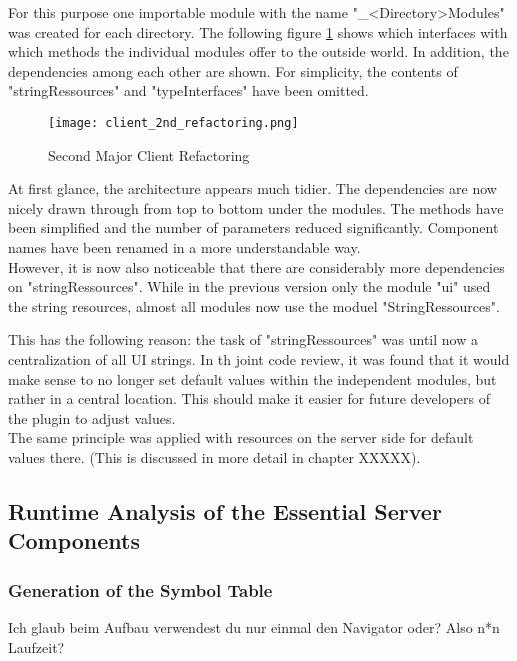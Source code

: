 For this purpose one importable module with the name "\_<Directory>Modules" was created for each directory.
The following figure \ref{fig:client_2nd_refactoring} shows which interfaces with which methods the individual modules offer to the outside world. In addition, the dependencies among each other are shown.
For simplicity, the contents of "stringRessources" and "typeInterfaces" have been omitted. \\

\begin{figure}[H]
    \centering
    \texttt{[image: client\_2nd\_refactoring.png]}
    \caption{Second Major Client Refactoring}
    \label{fig:client_2nd_refactoring}
\end{figure}

At first glance, the architecture appears much tidier.
The dependencies are now nicely drawn through from top to bottom under the modules.
The methods have been simplified and the number of parameters reduced significantly.
Component names have been renamed in a more understandable way. \\

However, it is now also noticeable that there are considerably more dependencies on "stringRessources".
While in the previous version only the module "ui" used the string resources, almost all modules now use the moduel "StringRessources".

This has the following reason: the task of "stringRessources" was until now a centralization of all UI strings. 
In th joint code review, it was found that it would make sense to no longer set default values within the independent modules,
but rather in a central location. This should make it easier for future developers of the plugin to adjust values. \\

The same principle was applied with resources on the server side for default values there.
(This is discussed in more detail in chapter XXXXX).

\subsection{Runtime Analysis of the Essential Server Components}
\subsubsection{Generation of the Symbol Table}
Ich glaub beim Aufbau verwendest du nur einmal den Navigator oder? Also n*n Laufzeit?

